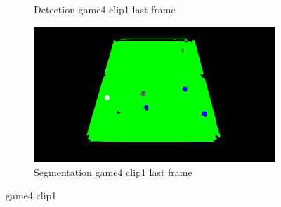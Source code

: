 \begin{figure}[H]
\begin{subfigure}[b]{0.35\textwidth}
        \caption{Detection game4 clip1 last frame}
        \label{fig: game4_clip1_last_frame_detected}
    \end{subfigure}
    \begin{subfigure}[b]{0.35\textwidth}
        \centering
        \includegraphics[width=\textwidth]{images/Segmentation/game4_clip1_segmented_balls_last_frame.jpg}
        \caption{Segmentation game4 clip1 last frame}
		\label{fig: game4_clip1_last_frame_segmented}
    \end{subfigure}
    
	\caption{game4 clip1}
\end{figure}


